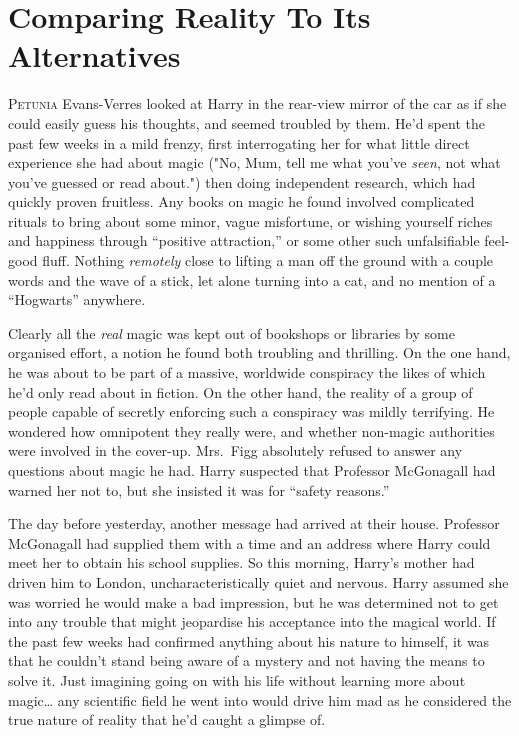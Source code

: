 \chapter{Comparing Reality To Its Alternatives}

\lettrine{P}{etunia} Evans-Verres looked at Harry in the rear-view
mirror of the car as if she could easily guess his thoughts,
and seemed troubled by them. He’d spent the past few
weeks in a mild frenzy, first interrogating her for what little
direct experience she had about magic ("No, Mum, tell me
what you’ve \emph{seen}, not what you’ve guessed or read
about.") then doing independent research, which had
quickly proven fruitless. Any books on magic he found
involved complicated rituals to bring about some minor,
vague misfortune, or wishing yourself riches and happiness
through “positive attraction,” or some other such
unfalsifiable feel-good fluff. Nothing \emph{remotely} close to lifting
a man off the ground with a couple words and the wave
of a stick, let alone turning into a cat, and no mention of
a “Hogwarts” anywhere.

Clearly all the \emph{real} magic was kept out of bookshops or
libraries by some organised effort, a notion he found both
troubling and thrilling. On the one hand, he was about to
be part of a massive, worldwide conspiracy the likes of
which he’d only read about in fiction. On the other hand,
the reality of a group of people capable of secretly
enforcing such a conspiracy was mildly terrifying. He
wondered how omnipotent they really were, and whether
non-magic authorities were involved in the cover-up.
Mrs.~Figg absolutely refused to answer any questions about magic
he had. Harry suspected that Professor McGonagall had warned her not to,
but she insisted it was for “safety reasons.”

The day before yesterday, another message had
arrived at their house. Professor McGonagall had supplied
them with a time and an address where Harry could meet
her to obtain his school supplies. So this morning, Harry’s
mother had driven him to London, uncharacteristically quiet
and nervous. Harry assumed she was worried he would
make a bad impression, but he was determined not to get
into any trouble that might jeopardise his acceptance into
the magical world. If the past few weeks had confirmed
anything about his nature to himself, it was that he
couldn’t stand being aware of a mystery and not having
the means to solve it. Just imagining going on with his life
without learning more about magic… any scientific field he
went into would drive him mad as he considered the true
nature of reality that he’d caught a glimpse of.

